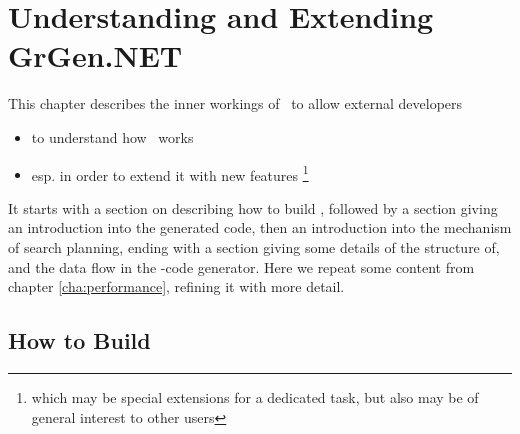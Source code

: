 \chapter{Understanding and Extending GrGen.NET} \label{cha:developing}

This chapter describes the inner workings of \GrG~to allow external developers
\begin{itemize}
\item to understand how \GrG~works
\item esp. in order to extend it with new features
\footnote{which may be special extensions for a dedicated task, but also may be of general interest to other users}
\end{itemize}
It starts with a section on describing how to build \GrG, followed by a section giving an introduction into the generated code, then an introduction into the mechanism of search planning, ending with a section giving some details of the structure of, and the data flow in the \GrG-code generator.
Here we repeat some content from chapter \ref{cha:performance}, refining it with more detail.

\section{How to Build}\label{sub:building}

